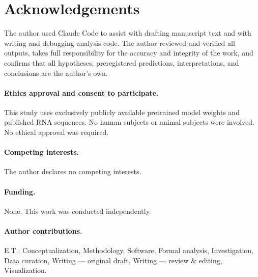 \documentclass[11pt]{article}
\begin{document}
\section*{Acknowledgements}

The author used Claude Code \citep{anthropic2025claude} to assist with
drafting manuscript text and with writing and debugging analysis code.
The author reviewed and verified all outputs, takes full responsibility
for the accuracy and integrity of the work, and confirms that all
hypotheses, preregistered predictions, interpretations, and conclusions
are the author's own.

\paragraph{Ethics approval and consent to participate.}
This study uses exclusively publicly available pretrained model weights
and published RNA sequences. No human subjects or animal subjects were
involved. No ethical approval was required.

\paragraph{Competing interests.} The author declares no competing interests.

\paragraph{Funding.} None. This work was conducted independently.

\paragraph{Author contributions.} E.T.: Conceptualization, Methodology,
Software, Formal analysis, Investigation, Data curation, Writing ---
original draft, Writing --- review \& editing, Visualization.




\end{document}

